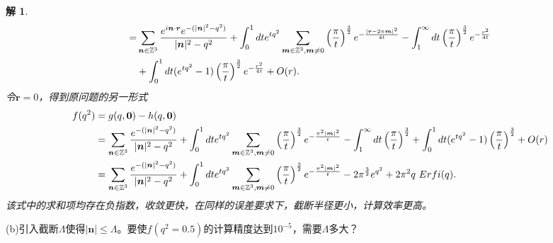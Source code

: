 \documentclass[10pt]{ctexart}
\newtheorem*{solution}{解}
\begin{document}
\begin{solution}
\begin{align}
        =&\sum\limits_{\bm{n}\in\mathbb{Z}^3}\frac{e^{i\bm{n}\cdot\bm{r}}e^{-(\lvert\bm{n}\rvert^2-q^2)}}{\lvert\bm{n}\rvert^2-q^2}+
        \int_{0}^{1}dte^{tq^2}\sum\limits_{\bm{m}\in\mathbb{Z}^3,\bm{m}\neq0}\left(\frac{\pi}{t}\right)^{\frac{3}{2}}e^{-\frac{\lvert\bm{r}-2\pi\bm{m}\rvert^2}{4t}}-\int_{1}^{\infty}dt \left(\frac{\pi}{t}\right)^{\frac{3}{2}}e^{-\frac{r^2}{4t}}\notag\\
        &+\int_{0}^{1}dt(e^{tq^2}-1)\left(\frac{\pi}{t}\right)^{\frac{3}{2}}e^{-\frac{r^2}{4t}}+O(r).\notag
    \end{align}
    令$\bm{r}=0$，得到原问题的另一形式
    \begin{align}
        f(q^2)&=g(q,\bm{0})-h(q,\bm{0})\notag\\
        &=\sum\limits_{\bm{n}\in\mathbb{Z}^3}\frac{e^{-(\lvert\bm{n}\rvert^2-q^2)}}{\lvert\bm{n}\rvert^2-q^2}+
        \int_{0}^{1}dte^{tq^2}\sum\limits_{\bm{m}\in\mathbb{Z}^3,\bm{m}\neq0}\left(\frac{\pi}{t}\right)^{\frac{3}{2}}e^{-\frac{\pi^2\lvert\bm{m}\rvert^2}{t}}-\int_{1}^{\infty}dt \left(\frac{\pi}{t}\right)^{\frac{3}{2}}+\int_{0}^{1}dt(e^{tq^2}-1)\left(\frac{\pi}{t}\right)^{\frac{3}{2}}+O(r)\notag\\
        &=\sum\limits_{\bm{n}\in\mathbb{Z}^3}\frac{e^{-(\lvert\bm{n}\rvert^2-q^2)}}{\lvert\bm{n}\rvert^2-q^2}+
        \int_{0}^{1}dte^{tq^2}\sum\limits_{\bm{m}\in\mathbb{Z}^3,\bm{m}\neq0}\left(\frac{\pi}{t}\right)^{\frac{3}{2}}e^{-\frac{\pi^2\lvert\bm{m}\rvert^2}{t}}-2\pi^{\frac{3}{2}}e^{q^2}+2\pi^2q\ Erfi(q).\notag
    \end{align}
    该式中的求和项均存在负指数，收敛更快，在同样的误差要求下，截断半径更小，计算效率更高。
\end{solution}
(b)引入截断$\Lambda$使得$\lvert\bm{n}\rvert\leqslant\Lambda$。要使$f(q^2=0.5)$的计算精度达到$10^{-5}$，需要$\Lambda$多大？
\end{document}
